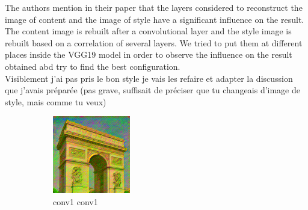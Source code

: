 \documentclass[twocolumn,superscriptaddress,aps, floatfix]{revtex4-1}
\begin{document}
    The authors mention in their paper that the layers considered to reconstruct the image of content and the image of style have a significant influence on the result. The content image is rebuilt after a convolutional layer and the style image is rebuilt based on a correlation of several layers. We tried to put them at different places inside the VGG19 model in order to observe the influence on the result obtained abd try to find the best configuration.\\
    
    Visiblement j'ai pas pris le bon style je vais les refaire et adapter la discussion que j'avais préparée (pas grave, suffisait de préciser que tu changeais d'image de style, mais comme tu veux)
    
    \begin{figure}[ht]
        \centering
        \begin{subfigure}[b]{0.1\textwidth}
            \centering
            \includegraphics[width=\textwidth]{resources/png/layers/conv1_conv1.png}
            \caption{conv1 conv1}
        \end{subfigure}
        \hfill
        \begin{subfigure}[b]{0.1\textwidth}
            \centering

\end{subfigure}
\end{figure}
\end{document}
